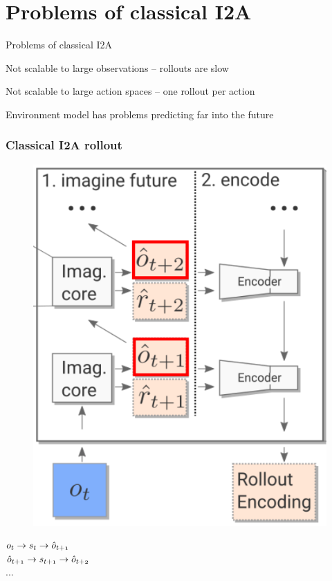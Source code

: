 
\section{Problems of classical I2A}
\begin{frame}{Problems of classical I2A}
    \begin{PraesentationAufzaehlung}
        \item Not scalable to large observations -- rollouts are slow
        \item Not scalable to large action spaces -- one rollout per action
        \item Environment model has problems predicting far into the future
    \end{PraesentationAufzaehlung}
\end{frame}

\begin{frame}
	\frametitle{Classical I2A rollout}
	\vspace{-10mm}
	\begin{multicols}{2}
	\begin{figure}[h]
		\centering
		\includegraphics[height=0.65\textheight]{./latent_i2a_images/SingleImaginationRollout_marked.png}
	\end{figure}
	\columnbreak
	\centering
	$\mathnormal{o_t \rightarrow s_t \rightarrow \hat{o}_{t+1}}$\\
	$\mathnormal{\hat{o}_{t+1} \rightarrow s_{t+1} \rightarrow \hat{o}_{t+2}}$\\
	...
	\end{multicols}
\end{frame}

